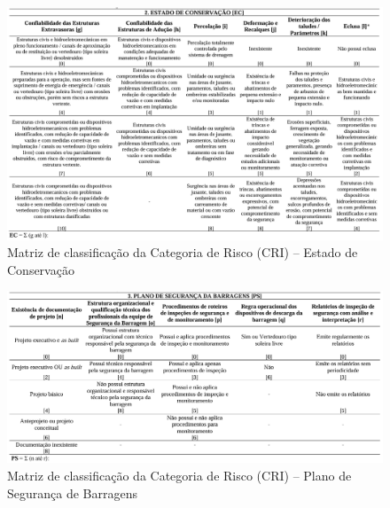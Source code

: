 \begin{figure}[htbp]
    \centering
    \includegraphics[width=\textwidth]{figures/image23_categoria_de_risco_ec.png}
    \caption{Matriz de classificação da Categoria de Risco (CRI) -- Estado de Conservação}
    \label{fig:categoria_risco_ec}
\end{figure}

\begin{figure}[htbp]
    \centering
    \includegraphics[width=\textwidth]{figures/image24_categoria_de_risco_ps.png}
    \caption{Matriz de classificação da Categoria de Risco (CRI) -- Plano de Segurança de Barragens}
    \label{fig:categoria_risco_ps}
\end{figure}

